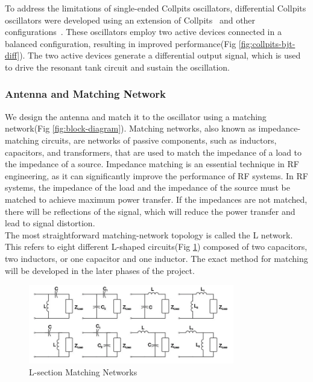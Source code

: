 \documentclass[]{extarticle}
\begin{document}
To address the limitations of single-ended Collpits oscillators, differential Collpits oscillators were developed using an extension of Collpits~\cite{article1} and other configurations~\cite{phdthesis}. These oscillators employ two active devices connected in a balanced configuration, resulting in improved performance(Fig \ref{fig:collpits-bjt-diff}). The two active devices generate a differential output signal, which is used to drive the resonant tank circuit and sustain the oscillation.



\subsubsection{Antenna and Matching Network}

 We design the antenna and match it to the oscillator using a matching network(Fig \ref{fig:block-diagram}). Matching networks, also known as impedance-matching circuits, are networks of passive components, such as inductors, capacitors, and transformers, that are used to match the impedance of a load to the impedance of a source. Impedance matching is an essential technique in RF engineering, as it can significantly improve the performance of RF systems. In RF systems, the impedance of the load and the impedance of the source must be matched to achieve maximum power transfer. If the impedances are not matched, there will be reflections of the signal, which will reduce the power transfer and lead to signal distortion. \\

The most straightforward matching-network topology is called the L network. This refers to eight different L-shaped circuits(Fig \ref{fig:matching-networks}) composed of two capacitors, two inductors, or one capacitor and one inductor. The exact method for matching will be developed in the later phases of the project. 

\begin{figure}[!h]
    \centering
    \includegraphics[width = 0.8\textwidth]{matching_networks.png}
    \caption{L-section Matching Networks}
    \label{fig:matching-networks}
\end{figure}
\end{document}
